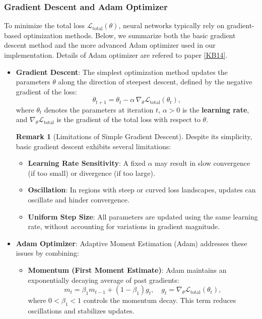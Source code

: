\documentclass[12pt,a4paper]{article}
\theoremstyle{definition}
\newtheorem{remark}{Remark}[subsection]
\begin{document}
\subsubsection{Gradient Descent and Adam Optimizer} \label{sec:adam_optimizer}

To minimize the total loss $\mathcal{L}_{\text{total}}(\theta)$, neural networks typically rely on gradient-based optimization methods. Below, we summarize both the basic gradient descent method and the more advanced Adam optimizer used in our implementation. Details of Adam optimizer are refered to paper \hyperlink{[KB14]}{[KB14]}.

\begin{itemize}

    \item \textbf{Gradient Descent}: The simplest optimization method updates the parameters $\theta$ along the direction of steepest descent, defined by the negative gradient of the loss:
    \[
    \theta_{t+1} = \theta_t - \alpha \, \nabla_\theta \mathcal{L}_{\text{total}}(\theta_t),
    \]
    where $\theta_t$ denotes the parameters at iteration $t$, $\alpha > 0$ is the \textbf{learning rate}, and $\nabla_\theta \mathcal{L}_{\text{total}}$ is the gradient of the total loss with respect to $\theta$.

    \begin{remark}[Limitations of Simple Gradient Descent]
    Despite its simplicity, basic gradient descent exhibits several limitations:
    \begin{itemize}
        \item \textbf{Learning Rate Sensitivity}: A fixed $\alpha$ may result in slow convergence (if too small) or divergence (if too large).
        \item \textbf{Oscillation}: In regions with steep or curved loss landscapes, updates can oscillate and hinder convergence.
        \item \textbf{Uniform Step Size}: All parameters are updated using the same learning rate, without accounting for variations in gradient magnitude.
    \end{itemize}
    \end{remark}

    \item \textbf{Adam Optimizer}: Adaptive Moment Estimation (Adam) addresses these issues by combining:
    \begin{itemize}
        \item \textbf{Momentum (First Moment Estimate)}: Adam maintains an exponentially decaying average of past gradients:
        \[
        m_t = \beta_1 m_{t-1} + (1 - \beta_1) g_t, \quad g_t = \nabla_\theta \mathcal{L}_{\text{total}}(\theta_t),
        \]
        where $0 < \beta_1 < 1$ controls the momentum decay. This term reduces oscillations and stabilizes updates.


\end{itemize}
\end{itemize}
\end{document}
